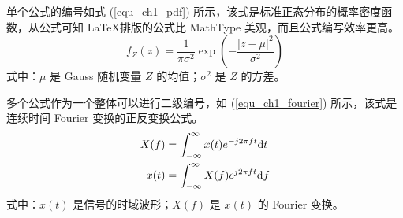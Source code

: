 
单个公式的编号如式 (\ref{equ_ch1_pdf}) 所示，该式是标准正态分布的概率密度函数，从公式可知 \LaTeX 排版的公式比 MathType 美观，而且公式编写效率更高。
%
\begin{equation} \label{equ_ch1_pdf}
f_Z(z) = \frac{1}{\pi\sigma^2} \exp\left(-\frac{|z-\mu|^2}{\sigma^2}\right)
\end{equation}
%
式中：$\mu$ 是 Gauss 随机变量 $Z$ 的均值；$\sigma^2$ 是 $Z$ 的方差。


多个公式作为一个整体可以进行二级编号，如 (\ref{equ_ch1_fourier}) 所示，该式是连续时间 Fourier 变换的正反变换公式。
%
\begin{subequations} \label{equ_ch1_fourier}
\begin{align}
X(f) &= \int_{-\infty}^{\infty}x(t)e^{-j2\pi f t}\mathrm{d} t \\
x(t) &= \int_{-\infty}^{\infty}X(f)e^{j2\pi f t}\mathrm{d} f
\end{align}
\end{subequations}
%
式中：$x(t)$ 是信号的时域波形；$X(f)$ 是 $x(t)$ 的 Fourier 变换。
